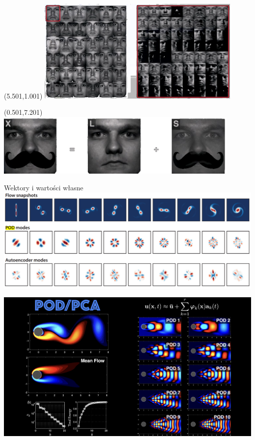 \documentclass[aspectratio=169]{beamer}
\begin{document}
	\begin{frame}
		\begin{textblock}{13}(5.501,1.001)
			\includegraphics[width=10cm]{imgs/faces2.png}
		\end{textblock}
		\begin{textblock}{13}(0.501,7.201)
			\includegraphics[width=12cm]{imgs/faces1.png}
		\end{textblock}
	\end{frame}

	\begin{frame}{Wektory i wartości własne}
		\includegraphics[width=14cm]{imgs/pca_pod.png}
	\end{frame}
	
	\begin{frame}
		\includegraphics[width=14cm]{imgs/patterns.jpg}
	\end{frame}
\end{document}
